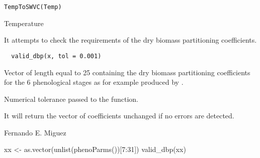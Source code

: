 \documentclass[letterpaper]{book}
\begin{document}
%
\begin{Usage}
\begin{verbatim}
TempToSWVC(Temp)
\end{verbatim}
\end{Usage}
%
\begin{Arguments}
\begin{ldescription}
\item[\code{Temp}] Temperature
\end{ldescription}
\end{Arguments}
%
\begin{Description}\relax
It attempts to check the requirements of the dry biomass
partitioning coefficients.
\end{Description}
%
\begin{Usage}
\begin{verbatim}
  valid_dbp(x, tol = 0.001)
\end{verbatim}
\end{Usage}
%
\begin{Arguments}
\begin{ldescription}
\item[\code{x}] Vector of length equal to 25 containing the dry
biomass partitioning coefficients for the 6 phenological
stages as for example produced by
.

\item[\code{tol}] Numerical tolerance passed to the
 function.
\end{ldescription}
\end{Arguments}
%
\begin{Value}
It will return the vector of coefficients unchanged if no
errors are detected.
\end{Value}
%
\begin{Author}\relax
Fernando E. Miguez
\end{Author}
%
\begin{SeeAlso}\relax
{}
\end{SeeAlso}
%
\begin{Examples}
\begin{ExampleCode}
xx <- as.vector(unlist(phenoParms())[7:31])
valid_dbp(xx)
\end{ExampleCode}
\end{Examples}
\end{document}

